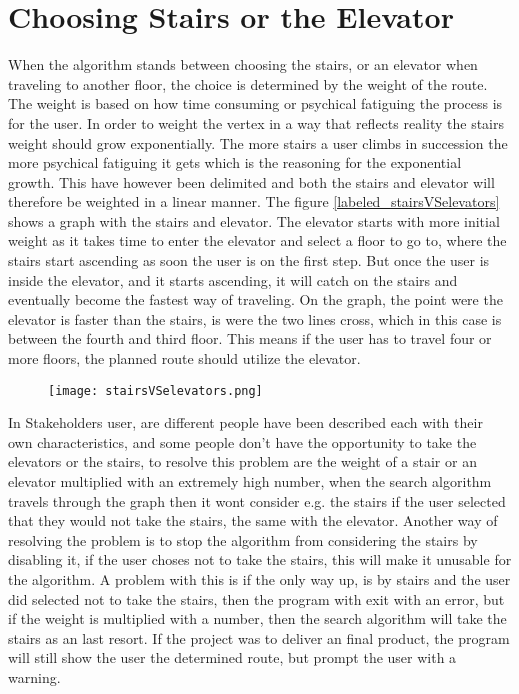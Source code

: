 \section{Choosing Stairs or the Elevator}
When the algorithm stands between choosing the stairs, or an elevator when traveling to another floor, the choice is determined by the weight of the route. The weight is based on how time consuming or psychical fatiguing the process is for the user. In order to weight the vertex in a way that reflects reality the stairs weight should grow exponentially. The more stairs a user climbs in succession the more psychical fatiguing it gets which is the reasoning for the exponential growth. This have however been delimited 
 and both the stairs and elevator will therefore be weighted in a linear manner. The figure \cref{labeled_stairsVSelevators} shows a graph with the stairs and elevator. The elevator starts with more initial weight as it takes time to enter the elevator and select a floor to go to, where the stairs start ascending as soon the user is on the first step. But once the user is inside the elevator, and it starts ascending, it will catch on the stairs and eventually become the fastest way of traveling. On the graph, the point were the elevator is faster than the stairs, is were the two lines cross, which in this case is between the fourth and third floor. This means if the user has to travel four or more floors, the planned route should utilize the elevator.

\begin{figure}[ht!]
    \centering
    \texttt{[image: stairsVSelevators.png]}
    \label{fig:labeled_stairsVSelevators}
  \end{figure}


  In Stakeholders user, are different people have been described each with their own characteristics, and some people don't have the opportunity to take the elevators or the stairs, to resolve this problem are the weight of a stair or an elevator multiplied with an extremely high number, when the search algorithm travels through the graph then it wont consider e.g. the stairs if the user selected that they would not take the stairs, the same with the elevator. Another way of resolving the problem is to stop the algorithm from considering the stairs by disabling it, if the user choses not to take the stairs, this will make it unusable for the algorithm. A problem with this is if the only way up, is by stairs and the user did selected not to take the stairs, then the program with exit with an error, but if the weight is multiplied with a number, then the search algorithm will take the stairs as an last resort. If the project was to deliver an final product, the program will still show the user the determined route, but prompt the user with a warning.
